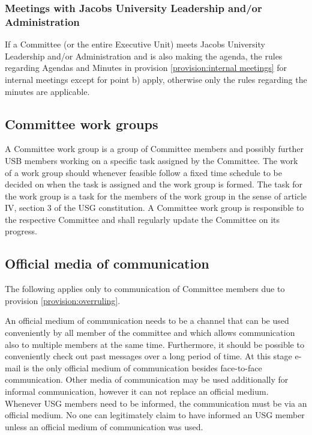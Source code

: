 \subsubsection{Meetings with Jacobs University Leadership and/or Administration}
  If a Committee (or the entire Executive Unit) meets Jacobs University Leadership and/or Administration and is also making the agenda, the rules regarding Agendas and Minutes in provision \ref{provision:internal meetings} for internal meetings except for point b) apply, otherwise only the rules regarding the minutes are applicable. 

\subsection[Work groups]{Committee work groups}
A Committee work group is a group of Committee members and possibly further USB members working on a specific task assigned by the Committee. The work of a work group should whenever feasible follow a fixed time schedule to be decided on when the task is assigned and the work group is formed. The task for the work group is a task for the members of the work group in the sense of article IV, section 3 of the USG constitution. 
A Committee work group is responsible to the respective Committee and shall regularly update the Committee on its progress. %

\subsection{Official media of communication}
The following applies only to communication of Committee members due to provision \ref{provision:overruling}.

An official medium of communication needs to be a channel that can be used conveniently by all member of the committee and which allows communication also to multiple members at the same time. Furthermore, it should be possible to conveniently check out past messages over a long period of time. At this stage e-mail is the only official medium of communication besides face-to-face communication. 
Other media of communication may be used additionally for informal communication, however it can not replace an official medium. Whenever USG members need to be informed, the communication must be via an official medium. No one can legitimately claim to have informed an USG member unless an official medium of communication was used. 

